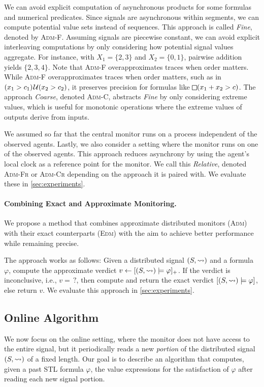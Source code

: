 We can avoid explicit computation of asynchronous products for some formulas and numerical predicates.
Since signals are asynchronous within segments, we can compute potential value sets instead of sequences.
This approach is called \emph{Fine}, denoted by \textsc{Adm-F}.
Assuming signals are piecewise constant, we can avoid explicit interleaving computations by only considering how potential signal values aggregate.
For instance, with $X_1 = \{2,3\}$ and $X_2 = \{0,1\}$, pairwise addition yields $\{2, 3, 4\}$.
Note that \textsc{Adm-F} overapproximates traces when order matters.
While \textsc{Adm-F} overapproximates traces when order matters, such as in $(x_1 > c_1) \kern.1em\mathcal{U} (x_2 > c_2)$, it preserves precision for formulas like $\LTLalways(x_1 + x_2 > c)$.
The approach \emph{Coarse}, denoted \textsc{Adm-C}, abstracts \emph{Fine} by only considering extreme values, which is useful for monotonic operations where the extreme values of outputs derive from inputs.

We assumed so far that the central monitor runs on a process independent of the observed agents.
Lastly, we also consider a setting where the monitor runs on one of the observed agents.
This approach reduces asynchrony by using the agent's local clock as a reference point for the monitor.
We call this \emph{Relative}, denoted \textsc{Adm-Fr} or \textsc{Adm-Cr} depending on the approach it is paired with.
We evaluate these in \cref{sec:experiments}.

\paragraph*{Combining Exact and Approximate Monitoring.}
We propose a method that combines approximate distributed monitors (\textsc{Adm}) with their exact counterparts (\textsc{Edm}) with the aim to achieve better performance while remaining precise.

The approach works as follows:
Given a distributed signal $(S,{\rightsquigarrow})$ and a formula $\varphi$, compute the approximate verdict $v \gets [(S,{\rightsquigarrow}) \models \varphi]_+$.
If the verdict is inconclusive, i.e., $v = {\,?}$, then compute and return the exact verdict $[(S,{\rightsquigarrow}) \models \varphi]$, else return $v$.
We evaluate this approach in \cref{sec:experiments}.

\bgroup \color{red}
\subsection{Online Algorithm}\label{sec:online}
We now focus on the online setting, where the monitor does not have access to the entire signal, but it periodically reads a new \emph{portion} of the distributed signal $(S,{\rightsquigarrow})$ of a fixed length.
Our goal is to describe an algorithm that computes, given a past STL formula $\varphi$, the value expressions for the satisfaction of $\varphi$ after reading each new signal portion.

